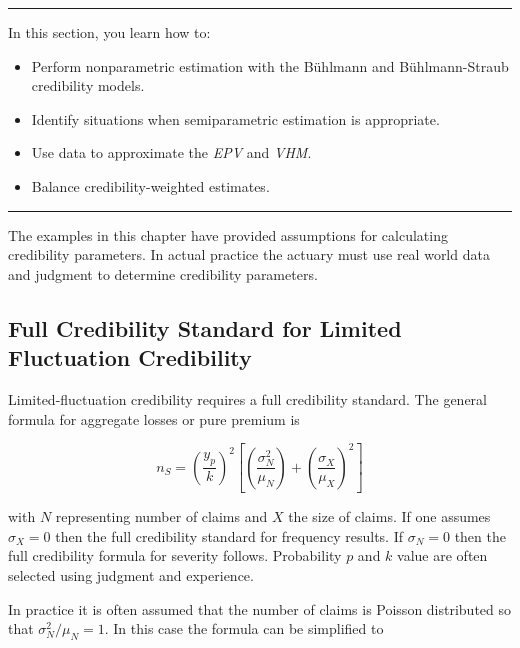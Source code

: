 \documentclass[]{book}
\providecommand{\tightlist}{%
  \setlength{\itemsep}{0pt}\setlength{\parskip}{0pt}}
\theoremstyle{definition}
\theoremstyle{definition}
\theoremstyle{definition}
\theoremstyle{remark}
\begin{document}
\begin{center}\rule{0.5\linewidth}{\linethickness}\end{center}

In this section, you learn how to:

\begin{itemize}
\tightlist
\item
  Perform nonparametric estimation with the Bühlmann and Bühlmann-Straub
  credibility models.
\item
  Identify situations when semiparametric estimation is appropriate.
\item
  Use data to approximate the \emph{EPV} and \emph{VHM}.
\item
  Balance credibility-weighted estimates.
\end{itemize}

\begin{center}\rule{0.5\linewidth}{\linethickness}\end{center}

The examples in this chapter have provided assumptions for calculating
credibility parameters. In actual practice the actuary must use real
world data and judgment to determine credibility parameters.

\subsection{Full Credibility Standard for Limited Fluctuation
Credibility}\label{full-credibility-standard-for-limited-fluctuation-credibility}

Limited-fluctuation credibility requires a full credibility standard.
The general formula for aggregate losses or pure premium is

\begin{equation*}
n_S=\left(\frac{y_p}{k}\right)^2\left[\left(\frac{\sigma_N^2}{\mu_N}\right)+\left(\frac{\sigma_X}{\mu_X}\right)^2\right]
\end{equation*}

\noindent with \(N\) representing number of claims and \(X\) the size of
claims. If one assumes \(\sigma_X=0\) then the full credibility standard
for frequency results. If \(\sigma_N=0\) then the full credibility
formula for severity follows. Probability \(p\) and \(k\) value are
often selected using judgment and experience.

In practice it is often assumed that the number of claims is Poisson
distributed so that \(\sigma_N^2/\mu_N=1\). In this case the formula can
be simplified to
\end{document}
